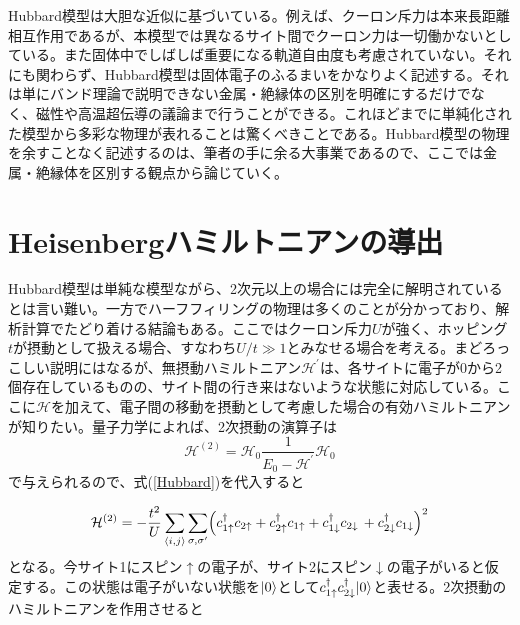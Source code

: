 \documentclass[12pt]{jarticle}
\begin{document}
Hubbard模型は大胆な近似に基づいている。例えば、クーロン斥力は本来長距離相互作用であるが、本模型では異なるサイト間でクーロン力は一切働かないとしている。また固体中でしばしば重要になる軌道自由度も考慮されていない。それにも関わらず、Hubbard模型は固体電子のふるまいをかなりよく記述する。それは単にバンド理論で説明できない金属・絶縁体の区別を明確にするだけでなく、磁性や高温超伝導の議論まで行うことができる。これほどまでに単純化された模型から多彩な物理が表れることは驚くべきことである。Hubbard模型の物理を余すことなく記述するのは、筆者の手に余る大事業であるので、ここでは金属・絶縁体を区別する観点から論じていく。

\section{Heisenbergハミルトニアンの導出}
Hubbard模型は単純な模型ながら、2次元以上の場合には完全に解明されているとは言い難い。一方でハーフフィリングの物理は多くのことが分かっており、解析計算でたどり着ける結論もある。ここではクーロン斥力$U$が強く、ホッピング$t$が摂動として扱える場合、すなわち$U/t \gg 1$とみなせる場合を考える。まどろっこしい説明にはなるが、無摂動ハミルトニアン$\mathcal{H}^{'}$は、各サイトに電子が0から2個存在しているものの、サイト間の行き来はないような状態に対応している。ここに$\mathcal{H}$を加えて、電子間の移動を摂動として考慮した場合の有効ハミルトニアンが知りたい。量子力学によれば、2次摂動の演算子は
\begin{equation}
  \mathcal{H}^{(2)} = \mathcal{H}_0 \frac{1}{E_0 - \mathcal{H}^{'}}\mathcal{H}_0
  \label{second perturbation}
\end{equation}
で与えられるので、式(\ref{Hubbard})を代入すると

\begin{eqnarray*}
\mathcal{H}^{(2)}
=
-\frac{t^2}{U}
\sum_{\langle i,j\rangle}\sum_{\sigma,\sigma'}
\Bigl(
   c_{1\uparrow}^\dagger c_{2\uparrow}
 + c_{2\uparrow}^\dagger c_{1\uparrow}
 + c_{1\downarrow}^\dagger c_{2\downarrow}\,
 + c_{2\downarrow}^\dagger c_{1\downarrow}
\Bigr)^2
\end{eqnarray*}
となる。今サイト1にスピン$\uparrow$の電子が、サイト2にスピン$\downarrow$の電子がいると仮定する。この状態は電子がいない状態を$\ket{0}$として$c_{1\uparrow}^\dagger c_{2\downarrow}^\dagger\!\ket{0}$と表せる。2次摂動のハミルトニアンを作用させると
\end{document}
